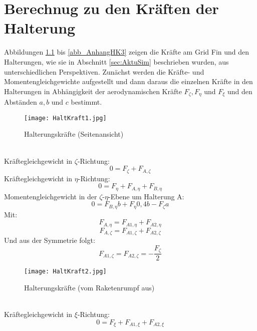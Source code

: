 \chapter{Berechnug zu den Kräften der Halterung}\label{sec:halterkraefte}
Abbildungen \ref{abb_AnhangHK1} bis \ref{abb_AnhangHK3} zeigen die Kräfte am Grid Fin und den Halterungen, wie sie in Abschnitt \ref{sec:AktuSim} beschrieben wurden, aus unterschiedlichen Perspektiven. Zunächst werden die Kräfte- und Momentengleichgewichte aufgestellt und dann daraus die einzelnen Kräfte in den Halterungen in Abhängigkeit der aerodynamischen Kräfte $F_\zeta, F_\eta$ und $F_\xi$ und den Abständen $a, b$ und $c$ bestimmt.
\begin{figure}[h] 
	\centering
	\texttt{[image: HaltKraft1.jpg]}
	\caption{Halterungskräfte (Seitenansicht)}
	\label{abb_AnhangHK1}
\end{figure}\\
Kräftegleichgewicht in $\zeta$-Richtung:
\begin{equation}\label{eq_h1}
	0 = F_\zeta + F_{A,\zeta}
\end{equation}
Kräftegleichgewicht in $\eta$-Richtung:
\begin{equation}\label{eq_h2}
	0= F_\eta + F_{A,\eta}+F_{B,\eta}
\end{equation}
Momentengleichgewicht in der $\zeta$-$\eta$-Ebene um Halterung A:
\begin{equation}\label{eq_h3}
	0 =F_{B,\eta}b +F_\eta 0,4b  - F_\zeta a
\end{equation}
Mit:
\begin{equation}\label{eq_h4}
	F_{A, \eta} = F_{A1, \eta}+F_{A2, \eta}
\end{equation}
\begin{equation}\label{eq_h5}
	F_{A, \zeta} = F_{A1, \zeta}+F_{A2, \zeta}
\end{equation}
Und aus der Symmetrie folgt:
\begin{equation}\label{eq_h6}
	F_{A1, \zeta}=F_{A2, \zeta} = -\frac{F_\zeta}{2}
\end{equation}
\begin{figure}[h] 
\centering
\texttt{[image: HaltKraft2.jpg]}
\caption{Halterungskräfte (vom Raketenrumpf aus)}
\end{figure}\\
Kräftegleichgewicht in $\xi$-Richtung:
\begin{equation}\label{eq_h7}
	0 = F_\xi + F_{A1,\xi} + F_{A2,\xi}
\end{equation}
